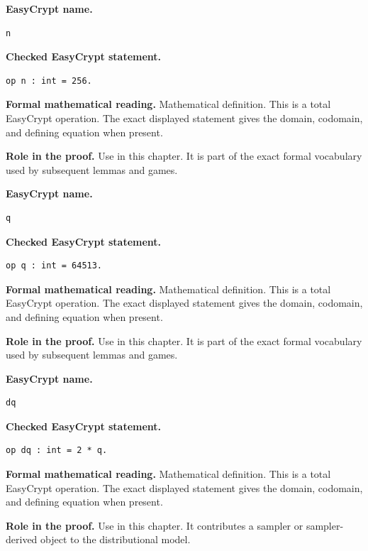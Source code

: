 \begin{formaldefinition}
\noindent\textbf{EasyCrypt name.}
\begin{lstlisting}[language=EasyCrypt,basicstyle=\ttfamily\scriptsize]
n
\end{lstlisting}
\noindent\textbf{Checked EasyCrypt statement.}
\begin{lstlisting}[language=EasyCrypt,basicstyle=\ttfamily\scriptsize]
op n : int = 256.
\end{lstlisting}
\noindent\textbf{Formal mathematical reading.}
Mathematical definition. This is a total EasyCrypt operation.  The exact displayed statement gives the domain, codomain, and defining equation when present.

\noindent\textbf{Role in the proof.}
Use in this chapter. It is part of the exact formal vocabulary used by subsequent lemmas and games.

\end{formaldefinition}

\begin{formaldefinition}
\noindent\textbf{EasyCrypt name.}
\begin{lstlisting}[language=EasyCrypt,basicstyle=\ttfamily\scriptsize]
q
\end{lstlisting}
\noindent\textbf{Checked EasyCrypt statement.}
\begin{lstlisting}[language=EasyCrypt,basicstyle=\ttfamily\scriptsize]
op q : int = 64513.
\end{lstlisting}
\noindent\textbf{Formal mathematical reading.}
Mathematical definition. This is a total EasyCrypt operation.  The exact displayed statement gives the domain, codomain, and defining equation when present.

\noindent\textbf{Role in the proof.}
Use in this chapter. It is part of the exact formal vocabulary used by subsequent lemmas and games.

\end{formaldefinition}

\begin{formaldefinition}
\noindent\textbf{EasyCrypt name.}
\begin{lstlisting}[language=EasyCrypt,basicstyle=\ttfamily\scriptsize]
dq
\end{lstlisting}
\noindent\textbf{Checked EasyCrypt statement.}
\begin{lstlisting}[language=EasyCrypt,basicstyle=\ttfamily\scriptsize]
op dq : int = 2 * q.
\end{lstlisting}
\noindent\textbf{Formal mathematical reading.}
Mathematical definition. This is a total EasyCrypt operation.  The exact displayed statement gives the domain, codomain, and defining equation when present.

\noindent\textbf{Role in the proof.}
Use in this chapter. It contributes a sampler or sampler-derived object to the distributional model.

\end{formaldefinition}

